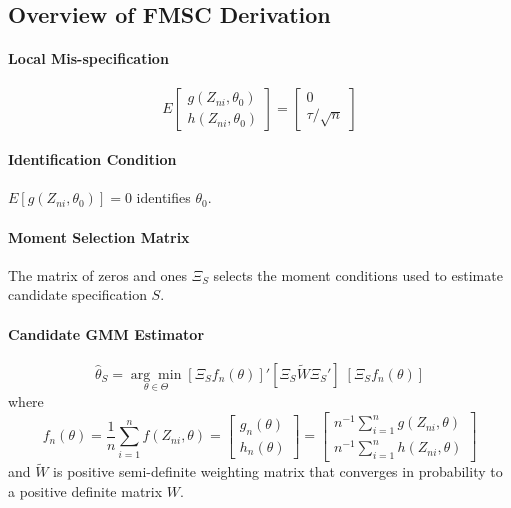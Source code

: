 \documentclass[12pt]{article}
\theoremstyle{definition}
\begin{document}
\subsection{Overview of FMSC Derivation}

\paragraph{Local Mis-specification}
	$$E\left[\begin{array}
		{c}
		g(Z_{ni},\theta_0)\\
		h(Z_{ni}, \theta_0)
	\end{array} \right] = \left[ \begin{array}
		{c} 0 \\ \tau/\sqrt{n}
	\end{array}\right]$$

\paragraph{Identification Condition} $E[g(Z_{ni},\theta_0)]=0$ identifies $\theta_0$.

\paragraph{Moment Selection Matrix} The matrix of zeros and ones $\Xi_S$ selects the moment conditions used to estimate candidate specification $S$.

\paragraph{Candidate GMM Estimator}
	$$\widehat{\theta}_S = \underset{\theta \in \Theta}{\arg \min} \left[\Xi_S f_n(\theta)\right]' \left[ \Xi_S \widetilde{W} \Xi_S'\right] \; \left[ \Xi_S f_n(\theta)\right]$$
where
$$f_n(\theta) = \frac{1}{n}\sum_{i=1}^n f(Z_{ni},\theta) = \left[\begin{array}{c} g_n(\theta)\\ h_n(\theta) \end{array} \right]=\left[\begin{array}{c}n^{-1}\sum_{i=1}^n g(Z_{ni},\theta) \\ n^{-1}\sum_{i=1}^n h(Z_{ni},\theta) \end{array}\right]$$
and $\widetilde{W}$ is positive semi-definite weighting matrix that converges in probability to a positive definite matrix $W$.
\end{document}
